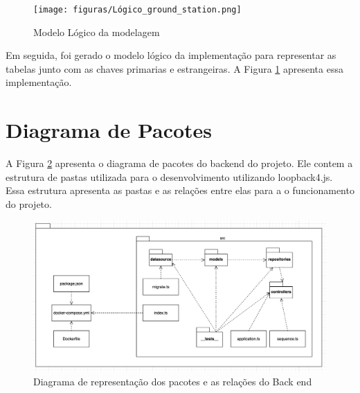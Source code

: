 \begin{figure}[h!]
	\centering
		\texttt{[image: figuras/Lógico\_ground\_station.png]}
	\caption{Modelo Lógico da modelagem}
	\label{fig:logico}
\end{figure}

\par Em seguida, foi gerado o modelo lógico da implementação para representar as tabelas junto com as chaves primarias e estrangeiras. A Figura \ref{fig:logico} apresenta essa implementação.

\section{Diagrama de Pacotes}
A Figura \ref{fig:diagrama_pacote_backend} apresenta o diagrama de pacotes do backend do projeto. Ele contem a estrutura de pastas utilizada para o desenvolvimento utilizando loopback4.js. Essa estrutura apresenta as pastas e as relações entre elas para a o funcionamento do projeto.
\begin{figure}[h!]
	\centering
		\includegraphics[keepaspectratio=true,scale=0.4]{figuras/diagrama_pacotes_backend.png}
	\caption{Diagrama de representação dos pacotes e as relações do Back end}
	\label{fig:diagrama_pacote_backend}
\end{figure}

